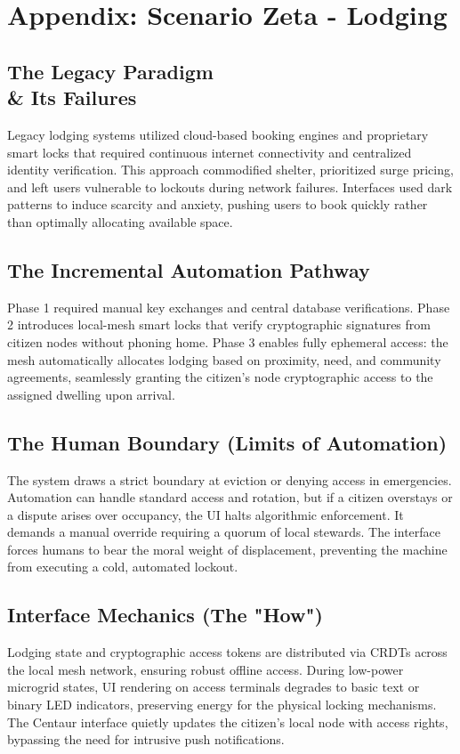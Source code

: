 \chapter{Appendix: Scenario Zeta - Lodging}

\section{The Legacy Paradigm \\\& Its Failures}
Legacy lodging systems utilized cloud-based booking engines and proprietary smart locks that required continuous internet connectivity and centralized identity verification. This approach commodified shelter, prioritized surge pricing, and left users vulnerable to lockouts during network failures. Interfaces used dark patterns to induce scarcity and anxiety, pushing users to book quickly rather than optimally allocating available space.

\section{The Incremental Automation Pathway}
Phase 1 required manual key exchanges and central database verifications. Phase 2 introduces local-mesh smart locks that verify cryptographic signatures from citizen nodes without phoning home. Phase 3 enables fully ephemeral access: the mesh automatically allocates lodging based on proximity, need, and community agreements, seamlessly granting the citizen's node cryptographic access to the assigned dwelling upon arrival.

\section{The Human Boundary (Limits of Automation)}
The system draws a strict boundary at eviction or denying access in emergencies. Automation can handle standard access and rotation, but if a citizen overstays or a dispute arises over occupancy, the UI halts algorithmic enforcement. It demands a manual override requiring a quorum of local stewards. The interface forces humans to bear the moral weight of displacement, preventing the machine from executing a cold, automated lockout.

\section{Interface Mechanics (The "How")}
Lodging state and cryptographic access tokens are distributed via CRDTs across the local mesh network, ensuring robust offline access. During low-power microgrid states, UI rendering on access terminals degrades to basic text or binary LED indicators, preserving energy for the physical locking mechanisms. The Centaur interface quietly updates the citizen's local node with access rights, bypassing the need for intrusive push notifications.

